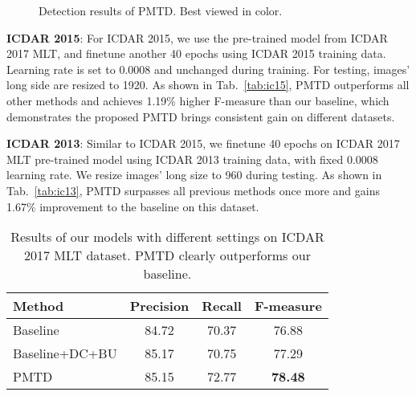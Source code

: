 \documentclass[10pt,twocolumn,letterpaper]{article}
\begin{document}
  \begin{figure*}
    \centering
    \vspace{5pt}
    \caption{Detection results of PMTD. Best viewed in color.}
    \label{fig:results}
  \end{figure*}

\textbf{ICDAR 2015}: For ICDAR 2015, we use the pre-trained model from  ICDAR 2017 MLT, and finetune another 40 epochs using ICDAR 2015 training data. Learning rate is set to 0.0008 and unchanged during training. For testing, images' long side are resized to 1920. As shown in Tab.~\ref{tab:ic15}, PMTD outperforms all other methods and achieves 1.19\% higher F-measure than our baseline, which demonstrates the proposed PMTD brings consistent gain on different datasets.

\textbf{ICDAR 2013}: Similar to ICDAR 2015, we finetune 40 epochs on ICDAR 2017 MLT pre-trained model using ICDAR 2013 training data, with fixed 0.0008 learning rate. We resize images' long size to 960 during testing. As shown in Tab.~\ref{tab:ic13}, PMTD surpasses all previous methods once more and gains 1.67\% improvement to the baseline on this dataset.

\begin{table}
  \small
  \begin{center}
  \begin{tabular}{l|ccc}
  \hline
  Method    & Precision   & Recall   & F-measure \\ \hline
  Baseline & 84.72 &	70.37 &	76.88   \\
  Baseline+DC+BU & 85.17 &	70.75 &	77.29    \\ \hline
  PMTD & 85.15&72.77&	\bf{78.48}   \\ \hline
  \end{tabular}
  \end{center}
  \caption{Results of our models with different settings on ICDAR 2017 MLT dataset. PMTD clearly outperforms our baseline.}
  \label{tab:ablation}
\end{table}
\end{document}
